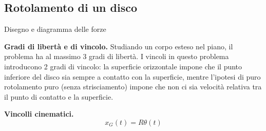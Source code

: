 \subsection{Rotolamento di un disco}
\begin{example}
    {\color{red} Disegno e diagramma delle forze}

    \noindent
    \textbf{Gradi di libertà e di vincolo.} Studiando un corpo esteso nel piano, il problema ha al massimo 3 gradi di libertà. I vincoli in questo problema introducono 2 gradi di vincolo: la superficie orizzontale impone che il punto inferiore del disco sia sempre a contatto con la superficie, mentre l'ipotesi di puro rotolamento puro (senza strisciamento) impone che non ci sia velocità relativa tra il punto di contatto e la superficie.

    \noindent
    \textbf{Vincolli cinematici.}
    \begin{equation}
        x_G(t) = R \theta(t)
    \end{equation}


\end{example}
